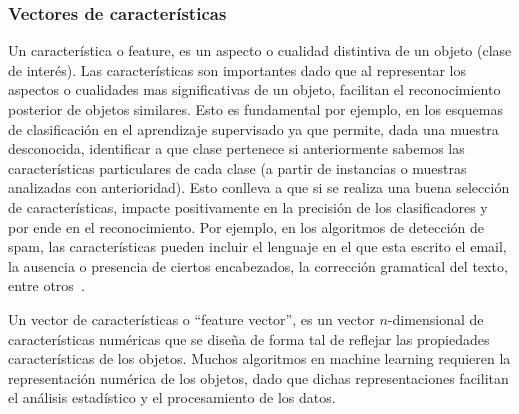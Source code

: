 \subsubsection{Vectores de características} \label{subsec:feature}

	Un característica o feature, es un aspecto o cualidad distintiva de un objeto (clase de interés). Las características son importantes dado que al representar los aspectos o cualidades mas significativas de un objeto, facilitan el reconocimiento posterior de objetos similares. Esto es fundamental por ejemplo, en los esquemas de clasificación en el aprendizaje supervisado ya que permite, dada una muestra desconocida, identificar a que clase pertenece si anteriormente sabemos las características particulares de cada clase (a partir de instancias o muestras analizadas con anterioridad). Esto conlleva a que si se realiza una buena selección de características, impacte positivamente en la precisión de los clasificadores y por ende en el reconocimiento. Por ejemplo, en los algoritmos de detección de spam, las características pueden incluir el lenguaje en el que esta escrito el email, la ausencia o presencia de ciertos encabezados, la corrección gramatical del texto, entre otros~\cite{SpamPaper}.

	Un vector de características o ``feature vector'', es un  vector $n$-dimensional de características numéricas que se diseña de forma tal de reflejar las propiedades características de los objetos. Muchos algoritmos en machine learning requieren la representación numérica de los objetos, dado que dichas representaciones facilitan el análisis estadístico y el procesamiento de los datos.
		
	
		
	
